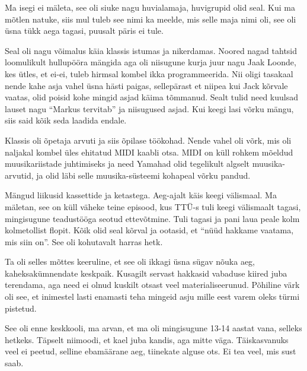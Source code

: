 
Ma isegi ei mäleta, see oli siuke  nagu huvialamaja, huvigrupid olid seal. Kui 
ma mõtlen natuke, siis mul tuleb see nimi ka meelde, mis selle maja nimi oli, 
see oli üsna tükk aega tagasi, puusalt päris ei tule.
                 
Seal oli nagu võimalus käia klassis istumas ja nikerdamas. Noored nagad tahtsid 
loomulikult hullupööra mängida aga oli niisugune kurja juur nagu Jaak Loonde, 
kes ütles, et ei-ei, tuleb hirmsal kombel ikka programmeerida. Nii oligi 
tasakaal nende kahe asja vahel üsna hästi paigas, sellepärast et niipea kui 
Jack kõrvale vaatas, olid poisid kohe mingid asjad käima tõmmanud. Sealt tulid 
need kuulsad lauset nagu \enquote{Markus tervitab} ja niisugused asjad. Kui 
keegi lasi võrku mängu, siis said kõik seda laadida endale. 


Klassis oli õpetaja arvuti ja siis õpilase töökohad. Nende vahel oli võrk, mis 
oli naljakal kombel üles ehitatud MIDI kaabli otsa. MIDI on küll rohkem mõeldud 
 muusikariistade juhtimiseks ja need Yamahad olid tegelikult algselt 
muusika-arvutid, ja olid läbi selle muusika-süsteemi kohapeal võrku pandud.

Mängud liikusid kassettide ja ketastega. Aeg-ajalt käis keegi välismaal. Ma 
mäletan, see on küll väheke teine episood, kus TTÜ-s tuli keegi välismaalt 
tagasi,  mingisugune teadustööga seotud ettevõtmine. Tuli tagasi ja pani laua 
peale kolm kolmetollist flopit. Kõik olid seal kõrval ja ootasid, et 
\enquote{nüüd hakkame vaatama, mis siin on}. See oli kohutavalt harras hetk.
                 

Ta oli selles mõttes keeruline, et see oli ikkagi üsna sügav nõuka aeg, 
kaheksakümnendate keskpaik. Kusagilt servast hakkasid vabaduse kiired juba 
terendama, aga need ei olnud kuskilt otsast veel materialiseerunud. Põhiline 
värk oli see, et inimestel lasti enamasti teha mingeid asju mille eest varem 
oleks türmi pistetud.

                 
See oli enne keskkooli, ma arvan, et ma oli mingisugune 13-14 aastat vana, 
selleks hetkeks. Täpselt niimoodi, et kael juba kandis, aga mitte väga. 
Täiskasvanuks  veel ei peetud, selline ebamäärane aeg, tiinekate alguse ots. Ei 
tea veel, mis sust saab.

